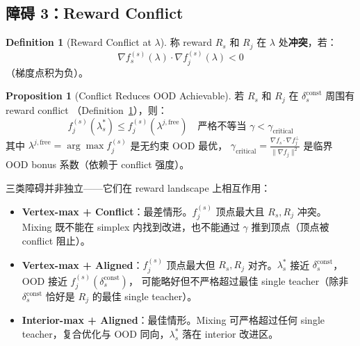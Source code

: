 \documentclass[11pt,a4paper]{article}
\newcommand{\const}{\mathrm{const}}
\theoremstyle{definition}
\newtheorem{definition}{Definition}
\newtheorem{proposition}{Proposition}
\begin{document}
\subsection{障碍 3：Reward Conflict}

\begin{definition}[Reward Conflict at $\lambda$]
\label{def:reward_conflict}
称 reward $R_s$ 和 $R_j$ 在 $\lambda$ 处\textbf{冲突}，若：
\begin{equation}
\nabla f_s^{(s)}(\lambda) \cdot \nabla f_j^{(s)}(\lambda) < 0
\label{eq:conflict}
\end{equation}
（梯度点积为负）。
\end{definition}

\begin{proposition}[Conflict Reduces OOD Achievable]
\label{prop:conflict}
若 $R_s$ 和 $R_j$ 在 $\delta_s^\const$ 周围有 reward conflict
（Definition~\ref{def:reward_conflict}），则：
\begin{equation}
f_j^{(s)}(\lambda_s^*) \leq f_j^{(s)}(\lambda^{j,\text{free}})
\quad\text{严格不等当 } \gamma < \gamma_{\text{critical}}
\end{equation}
其中 $\lambda^{j,\text{free}} = \arg\max f_j^{(s)}$ 是无约束 OOD 最优，
$\gamma_{\text{critical}} = \frac{\nabla f_s \cdot \nabla f_j^{\perp}}{\|\nabla f_j\|^2}$
是临界 OOD bonus 系数（依赖于 conflict 强度）。
\end{proposition}

\begin{tcolorbox}[colback=red!5,colframe=red!40,title=三类障碍的耦合关系]
三类障碍并非独立——它们在 reward landscape 上相互作用：
\begin{itemize}[leftmargin=1.5em]
\item \textbf{Vertex-max + Conflict}：最差情形。$f_j^{(s)}$ 顶点最大且
$R_s, R_j$ 冲突。Mixing 既不能在 simplex 内找到改进，也不能通过 $\gamma$
推到顶点（顶点被 conflict 阻止）。
\item \textbf{Vertex-max + Aligned}：$f_j^{(s)}$ 顶点最大但 $R_s, R_j$
对齐。$\lambda_s^*$ 接近 $\delta_s^\const$，OOD 接近 $f_j^{(s)}(\delta_s^\const)$，
可能略好但不严格超过最佳 single teacher（除非 $\delta_s^\const$ 恰好是
$R_j$ 的最佳 single teacher）。
\item \textbf{Interior-max + Aligned}：最佳情形。Mixing 可严格超过任何 single
teacher，复合优化与 OOD 同向，$\lambda_s^*$ 落在 interior 改进区。
\end{itemize}
\end{tcolorbox}

\end{document}
